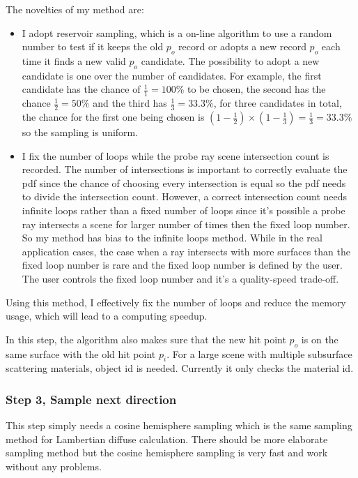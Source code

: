 \documentclass[letterpaper,12pt]{article}
\begin{document}
The novelties of my method are:
\begin{itemize}
    \item I adopt reservoir sampling, which is a on-line algorithm to use a random number to test if it keeps the old $p_o$ record or adopts a new record $p_o$ each time it finds a new valid $p_o$ candidate. The possibility to adopt a new candidate is one over the number of candidates. For example, the first candidate has the chance of $\frac{1}{1}=100\%$ to be chosen, the second has the chance $\frac{1}{2}=50\%$ and the third has $\frac{1}{3}=33.3\%$, for three candidates in total, the chance for the first one being chosen is $(1-\frac{1}{2})\times(1-\frac{1}{3}) = \frac{1}{3}=33.3\%$ so the sampling is uniform.
    \item I fix the number of loops while the probe ray scene intersection count is recorded. The number of intersections is important to correctly evaluate the pdf since the chance of choosing every intersection is equal so the pdf needs to divide the intersection count. However, a correct intersection count needs infinite loops rather than a fixed number of loops since it's possible a probe ray intersects a scene for larger number of times then the fixed loop number. So my method has bias to the infinite loops method. While in the real application cases, the case when a ray intersects with more surfaces than the fixed loop number is rare and the fixed loop number is defined by the user. The user controls the fixed loop number and it's a quality-speed trade-off.
\end{itemize}
Using this method, I effectively fix the number of loops and reduce the memory usage, which will lead to a computing speedup.

In this step, the algorithm also makes sure that the new hit point $p_o$ is on the same surface with the old hit point $p_i$. For a large scene with multiple subsurface scattering materials, object id is needed. Currently it only checks the material id.

\subsubsection{Step 3, Sample next direction}

This step simply needs a cosine hemisphere sampling which is the same sampling method for Lambertian diffuse calculation. There should be more elaborate sampling method but the cosine hemisphere sampling is very fast and work without any problems.
\end{document}
